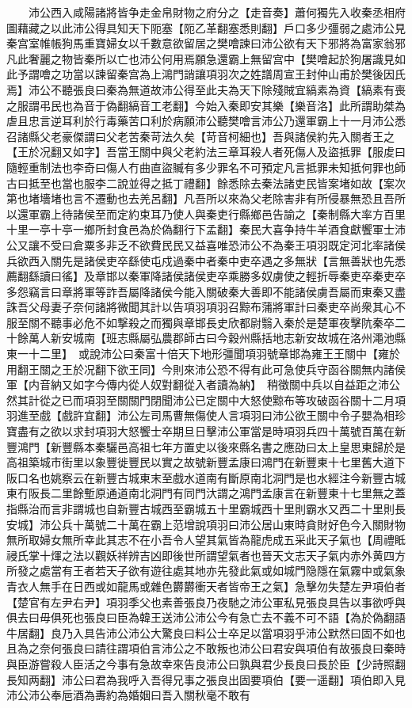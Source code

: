 　　沛公西入咸陽諸將皆争走金帛財物之府分之【走音奏】蕭何獨先入收秦丞相府圖藉藏之以此沛公得具知天下阨塞【阨乙革翻塞悉則翻】戶口多少彊弱之處沛公見秦宫室帷帳狗馬重寶婦女以千數意欲留居之樊噲諫曰沛公欲有天下邪將為富家翁邪凡此奢麗之物皆秦所以亡也沛公何用焉願急還霸上無留宫中【樊噲起於狗屠識見如此予謂噲之功當以諫留秦宫為上鴻門誚讓項羽次之姓譜周宣王封仲山甫於樊後因氏焉】沛公不聽張良曰秦為無道故沛公得至此夫為天下除殘賊宜縞素為資【縞素有喪之服謂弔民也為音于偽翻縞音工老翻】今始入秦即安其樂【樂音洛】此所謂助桀為虐且忠言逆耳利於行毒藥苦口利於病願沛公聽樊噲言沛公乃還軍霸上十一月沛公悉召諸縣父老豪傑謂曰父老苦秦苛法久矣【苛音柯細也】吾與諸侯約先入關者王之【王於况翻又如字】吾當王關中與父老約法三章耳殺人者死傷人及盜抵罪【服䖍曰隨輕重制法也李奇曰傷人冇曲直盜贓有多少罪名不可預定凡言抵罪未知抵何罪也師古曰抵至也當也服李二說並得之抵丁禮翻】餘悉除去秦法諸吏民皆案堵如故【案次第也堵墻堵也言不遷動也去羌呂翻】凡吾所以來為父老除害非有所侵暴無恐且吾所以還軍霸上待諸侯至而定約束耳乃使人與秦吏行縣鄉邑告諭之【秦制縣大率方百里十里一亭十亭一鄉所封食邑為於偽翻行下孟翻】秦民大喜争持牛羊酒食獻饗軍士沛公又讓不受曰倉粟多非乏不欲費民民又益喜唯恐沛公不為秦王項羽既定河北率諸侯兵欲西入關先是諸侯吏卒繇使屯戍過秦中者秦中吏卒遇之多無狀【言無善狀也先悉薦翻繇讀曰徭】及章邯以秦軍降諸侯諸侯吏卒乘勝多奴虜使之輕折辱秦吏卒秦吏卒多怨竊言曰章將軍等詐吾屬降諸侯今能入關破秦大善即不能諸侯虜吾屬而東秦又盡誅吾父母妻子奈何諸將微聞其計以告項羽項羽召黥布蒲將軍計曰秦吏卒尚衆其心不服至關不聽事必危不如撃殺之而獨與章邯長史欣都尉翳入秦於是楚軍夜擊阬秦卒二十餘萬人新安城南【班志縣屬弘農郡師古曰今穀州縣括地志新安故城在洛州澠池縣東一十二里】　或說沛公曰秦富十倍天下地形彊聞項羽號章邯為雍王王關中【雍於用翻王關之王於况翻下欲王同】今則來沛公恐不得有此可急使兵守函谷關無内諸侯軍【内音納又如字今傳内從人奴對翻從入者讀為納】　稍徵關中兵以自益距之沛公然其計從之已而項羽至關關門閉聞沛公已定關中大怒使黥布等攻破函谷關十二月項羽進至戲【戲許宜翻】沛公左司馬曹無傷使人言項羽曰沛公欲王關中令子嬰為相珍寶盡有之欲以求封項羽大怒饗士卒期旦日擊沛公軍當是時項羽兵四十萬號百萬在新豐鴻門【新豐縣本秦驪邑高祖七年方置史以後來縣名書之應劭曰太上皇思東歸於是高祖築城市街里以象豐徙豐民以實之故號新豐孟康曰鴻門在新豐東十七里舊大道下阪口名也姚察云在新豐古城東末至戲水道南有斷原南北洞門是也水經注今新豐古城東冇阪長二里餘塹原通道南北洞門有同門汏謂之鴻門孟康言在新豐東十七里無之蓋指縣治而言非謂城也自新豐古城西至霸城五十里霸城西十里則霸水又西二十里則長安城】沛公兵十萬號二十萬在霸上范增說項羽曰沛公居山東時貪財好色今入關財物無所取婦女無所幸此其志不在小吾令人望其氣皆為龍虎成五采此天子氣也【周禮眡祲氏掌十煇之法以觀妖祥辨吉凶即後世所謂望氣者也晉天文志天子氣内赤外黄四方所發之處當有王者若天子欲有遊往處其地亦先發此氣或如城門隐隱在氣霧中或氣象青衣人無手在日西或如龍馬或雜色欝欝衝天者皆帝王之氣】急擊勿失楚左尹項伯者【楚官有左尹右尹】項羽季父也素善張良乃夜馳之沛公軍私見張良具告以事欲呼與俱去曰毋俱死也張良曰臣為韓王送沛公沛公今有急亡去不義不可不語【為於偽翻語牛居翻】良乃入具告沛公沛公大驚良曰料公士卒足以當項羽乎沛公默然曰固不如也且為之奈何張良曰請往謂項伯言沛公之不敢叛也沛公曰君安與項伯有故張良曰秦時與臣游嘗殺人臣活之今事有急故幸來告良沛公曰孰與君少長良曰長於臣【少詩照翻長知两翻】沛公曰君為我呼入吾得兄事之張良出固要項伯【要一遥翻】項伯即入見沛公沛公奉巵酒為夀約為婚姻曰吾入關秋毫不敢有